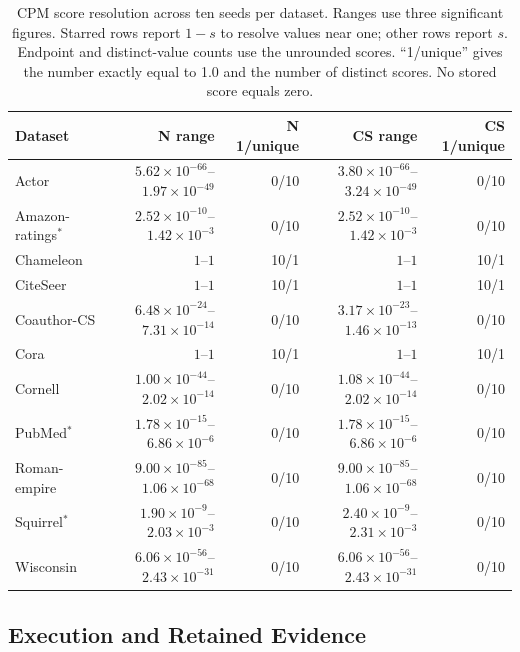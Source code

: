 \begin{table}[tbp]
\centering
\caption{CPM score resolution across ten seeds per dataset. Ranges use three significant figures. Starred rows report $1-s$ to resolve values near one; other rows report $s$. Endpoint and distinct-value counts use the unrounded scores. ``1/unique'' gives the number exactly equal to 1.0 and the number of distinct scores. No stored score equals zero.}
\label{tab:cpm_resolution}
\footnotesize
\setlength{\tabcolsep}{2pt}
\begin{tabular}{@{}lrrrr@{}}
\toprule
Dataset & N range & N 1/unique & CS range & CS 1/unique \\
\midrule
Actor & $5.62\!\times\!10^{-66}$--$1.97\!\times\!10^{-49}$ & 0/10 & $3.80\!\times\!10^{-66}$--$3.24\!\times\!10^{-49}$ & 0/10 \\
Amazon-ratings$^{*}$ & $2.52\!\times\!10^{-10}$--$1.42\!\times\!10^{-3}$ & 0/10 & $2.52\!\times\!10^{-10}$--$1.42\!\times\!10^{-3}$ & 0/10 \\
Chameleon & $1$--$1$ & 10/1 & $1$--$1$ & 10/1 \\
CiteSeer & $1$--$1$ & 10/1 & $1$--$1$ & 10/1 \\
Coauthor-CS & $6.48\!\times\!10^{-24}$--$7.31\!\times\!10^{-14}$ & 0/10 & $3.17\!\times\!10^{-23}$--$1.46\!\times\!10^{-13}$ & 0/10 \\
Cora & $1$--$1$ & 10/1 & $1$--$1$ & 10/1 \\
Cornell & $1.00\!\times\!10^{-44}$--$2.02\!\times\!10^{-14}$ & 0/10 & $1.08\!\times\!10^{-44}$--$2.02\!\times\!10^{-14}$ & 0/10 \\
PubMed$^{*}$ & $1.78\!\times\!10^{-15}$--$6.86\!\times\!10^{-6}$ & 0/10 & $1.78\!\times\!10^{-15}$--$6.86\!\times\!10^{-6}$ & 0/10 \\
Roman-empire & $9.00\!\times\!10^{-85}$--$1.06\!\times\!10^{-68}$ & 0/10 & $9.00\!\times\!10^{-85}$--$1.06\!\times\!10^{-68}$ & 0/10 \\
Squirrel$^{*}$ & $1.90\!\times\!10^{-9}$--$2.03\!\times\!10^{-3}$ & 0/10 & $2.40\!\times\!10^{-9}$--$2.31\!\times\!10^{-3}$ & 0/10 \\
Wisconsin & $6.06\!\times\!10^{-56}$--$2.43\!\times\!10^{-31}$ & 0/10 & $6.06\!\times\!10^{-56}$--$2.43\!\times\!10^{-31}$ & 0/10 \\
\bottomrule
\end{tabular}
\end{table}

\subsection{Execution and Retained Evidence}

